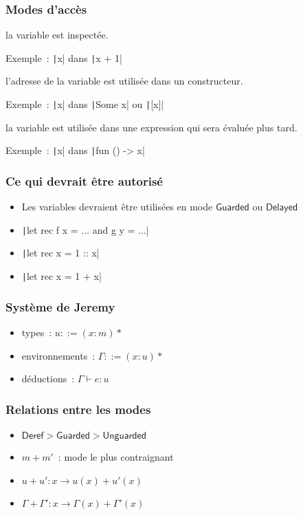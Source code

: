 \documentclass{beamer}
\newcommand{\Deref}{\mathsf{Deref}}
\newcommand{\Unguarded}{\mathsf{Unguarded}}
\newcommand{\Guarded}{\mathsf{Guarded}}
\newcommand{\Delayed}{\mathsf{Delayed}}
\begin{document}
\begin{frame}
  \frametitle{Modes d'accès}
  \begin{description}
    \item[Deref] la variable est inspectée.

      Exemple : \texttt|x| dans \texttt|x + 1|

    \item<2->[Guarded] l'adresse de la variable est utilisée dans un constructeur.

      Exemple : \texttt|x| dans \texttt|Some x| ou \texttt|[x]|

    \item<3->[Delayed] la variable est utilisée dans une expression qui sera évaluée
      plus tard.

      Exemple : \texttt|x| dans \texttt|fun () -> x|
  \end{description}
\end{frame}

\begin{frame}
  \frametitle{Ce qui devrait être autorisé}
  \begin{itemize}
    \item Les variables devraient être utilisées en mode $\Guarded$ ou
      $\Delayed$
    \item \texttt|let rec f x = ... and g y = ...|
    \item \texttt|let rec x = 1 :: x|
    \item \texttt|let rec x = 1 + x|
  \end{itemize}
\end{frame}

\begin{frame}
  \frametitle{Système de Jeremy}
  \begin{itemize}
    \item types : $u ::= (x : m)*$
    \item environnements : $\Gamma ::= (x: u)*$
    \item déductions : $\Gamma \vdash e: u$
  \end{itemize}
\end{frame}

\begin{frame}
  \frametitle{Relations entre les modes}
  \begin{itemize}
    \item $\Deref > \Guarded > \Unguarded$
    \item $m + m'$ : mode le plus contraignant
    \item $u + u' : x \rightarrow u(x) + u'(x)$
    \item $\Gamma + \Gamma' : x \rightarrow \Gamma(x) + \Gamma'(x)$
  \end{itemize}
\end{frame}
\end{document}
